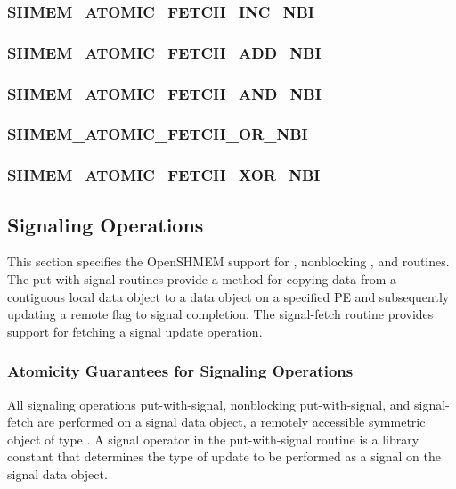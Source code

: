 \documentclass[10pt]{book}
\begin{document}
\subsubsection{\textbf{SHMEM\_ATOMIC\_FETCH\_INC\_NBI}}
\label{subsec:shmem_atomic_fetch_inc_nbi}


\subsubsection{\textbf{SHMEM\_ATOMIC\_FETCH\_ADD\_NBI}}
\label{subsec:shmem_atomic_fetch_add_nbi}


\subsubsection{\textbf{SHMEM\_ATOMIC\_FETCH\_AND\_NBI}}
\label{subsec:shmem_atomic_fetch_and_nbi}


\subsubsection{\textbf{SHMEM\_ATOMIC\_FETCH\_OR\_NBI}}
\label{subsec:shmem_atomic_fetch_or_nbi}


\subsubsection{\textbf{SHMEM\_ATOMIC\_FETCH\_XOR\_NBI}}
\label{subsec:shmem_atomic_fetch_xor_nbi}




\subsection{Signaling Operations}\label{sec:shmem_signal}
This section specifies the OpenSHMEM support for ,
nonblocking , and  routines. The
put-with-signal routines provide a method for copying data from a contiguous
local data object to a data object on a specified \ac{PE} and subsequently
updating a remote flag to signal completion. The signal-fetch routine provides
support for fetching a signal update operation.

\subsubsection{Atomicity Guarantees for Signaling Operations}
\label{subsec:signal_atomicity}
All signaling operations put-with-signal, nonblocking put-with-signal, and
signal-fetch are performed on a signal data object, a remotely accessible
symmetric object of type . A signal operator in the
put-with-signal routine is a \openshmem library constant that determines the
type of update to be performed as a signal on the signal data object.
\end{document}
